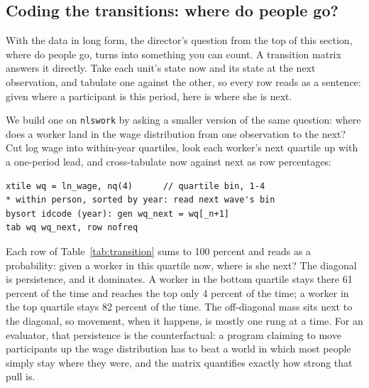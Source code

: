 \documentclass[
    a4paper,
    fontsize=10pt,
    twoside=true,
    numbers=noenddot,
]{kaobook}
\begin{document}
\subsection{Coding the transitions: where do people go?}\label{sec:ch06-transitions}
With the data in long form, the director's question from the top of this section, where do people go, turns into something you can count. A transition matrix answers it directly. Take each unit's state now and its state at the next observation, and tabulate one against the other, so every row reads as a sentence: given where a participant is this period, here is where she is next.

We build one on \texttt{nlswork} by asking a smaller version of the same question: where does a worker land in the wage distribution from one observation to the next? Cut log wage into within-year quartiles, look each worker's next quartile up with a one-period lead, and cross-tabulate now against next as row percentages:
\par
{\footnotesize
\begin{verbatim}
xtile wq = ln_wage, nq(4)      // quartile bin, 1-4
* within person, sorted by year: read next wave's bin
bysort idcode (year): gen wq_next = wq[_n+1]
tab wq wq_next, row nofreq
\end{verbatim}
}
Each row of Table~\ref{tab:transition} sums to 100 percent and reads as a probability: given a worker in this quartile now, where is she next? The diagonal is persistence, and it dominates. A worker in the bottom quartile stays there 61 percent of the time and reaches the top only 4 percent of the time; a worker in the top quartile stays 82 percent of the time. The off-diagonal mass sits next to the diagonal, so movement, when it happens, is mostly one rung at a time. For an evaluator, that persistence is the counterfactual: a program claiming to move participants up the wage distribution has to beat a world in which most people simply stay where they were, and the matrix quantifies exactly how strong that pull is.
\end{document}

